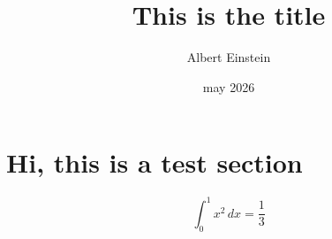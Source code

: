 \title{This is the title}
\author{Albert Einstein}
\date{may 2026}

\maketitle


\section{Hi, this is a test section}
\begin{equation}
    \int_0^1 x^2 \, dx = \frac{1}{3}
\end{equation}